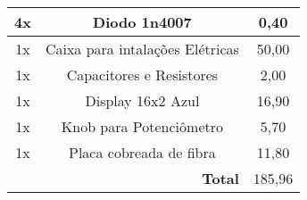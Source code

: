 \documentclass[journal]{IEEEtran}
\begin{document}
\begin{table}[!htpb]
\begin{tabular}{c|c|c|}
\multicolumn{1}{|c|}{4x}                  & Diodo 1n4007                                     & 0,40                                          \\ \hline
\multicolumn{1}{|c|}{1x}                  & Caixa para intalações Elétricas                  & 50,00                                         \\ \hline
\multicolumn{1}{|c|}{1x}                  & Capacitores e Resistores                         & 2,00                                          \\ \hline
\multicolumn{1}{|c|}{1x}                  & Display 16x2 Azul                                & 16,90                                         \\ \hline
\multicolumn{1}{|c|}{1x}                  & Knob para Potenciômetro                          & 5,70                                          \\ \hline
\multicolumn{1}{|c|}{1x}                  & Placa cobreada de fibra                          & 11,80                                         \\ \hline
\multicolumn{1}{l|}{}                     & \multicolumn{1}{r|}{\textbf{Total}}              & 185,96                                        \\ \cline{2-3} 
\end{tabular}
\end{table}











% 
% 
% 
% 
% 
\end{document}
